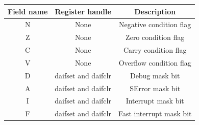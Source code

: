 \documentclass[12pt,a4paper,openright,twoside]{report}
\begin{document}
\begin{table}[t]
    \begin{center}
    \begin{tabular}{|c|c|c|}
    \hline
    \rowcolor[HTML]{9B9B9B} 
    Field name & Register handle              & Description                                                                                                                                                                                           \\ \hline
    N          & \cellcolor[HTML]{FFFFFF}None & Negative condition flag                                                                                                                                                                               \\ \hline
    Z          & None                         & Zero condition flag                                                                                                                                                                                   \\ \hline
    C          & None                         & Carry condition flag                                                                                                                                                                                  \\ \hline
    V          & None                         & Overflow condition flag                                                                                                                                                                               \\ \hline
    D          & daifset and daifclr          & Debug mask bit                                                                                                                                                                                        \\ \hline
    A          & daifset and daifclr          & SError mask bit                                                                                                                                                                                       \\ \hline
    I          & daifset and daifclr          & Interrupt mask bit                                                                                                                                                                                    \\ \hline
    F          & daifset and daifclr          & Fast interrupt mask bit                                                                                                                                                                               \\ \hline

\end{tabular}
\end{center}
\end{table}
\end{document}
